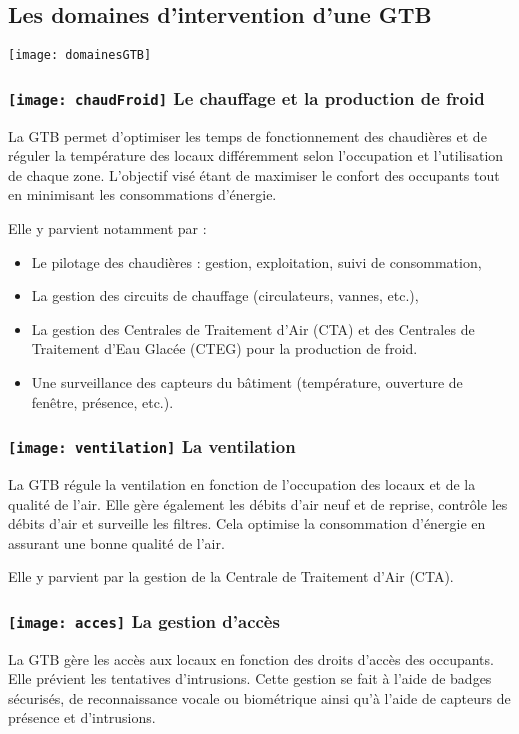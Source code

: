 \subsection{Les domaines d'intervention d'une GTB}
\begin{center}
	\texttt{[image: domainesGTB]}
\end{center}
\subsubsection{\texttt{[image: chaudFroid]} Le chauffage et la production de froid}
La GTB permet d'optimiser les temps de fonctionnement des chaudières et de réguler la température des locaux différemment selon l'occupation et l'utilisation de chaque zone. L'objectif visé étant de maximiser le confort des occupants tout en minimisant les consommations d'énergie.

Elle y parvient notamment par :
\begin{itemize}
	\item Le pilotage des chaudières : gestion, exploitation, suivi de consommation,
	\item La gestion des circuits de chauffage (circulateurs, vannes, etc.),
	\item La gestion des Centrales de Traitement d'Air (CTA) et des Centrales de Traitement d'Eau Glacée (CTEG) pour la production de froid.
	\item Une surveillance des capteurs du bâtiment (température, ouverture de fenêtre, présence, etc.).
\end{itemize}

\subsubsection{\texttt{[image: ventilation]} La ventilation}
La GTB régule la ventilation en fonction de l'occupation des locaux et de la qualité de l'air. Elle gère également les débits d'air neuf et de reprise, contrôle les débits d'air et surveille les filtres. Cela optimise la consommation d'énergie en assurant une bonne qualité de l'air.

Elle y parvient par la gestion de la Centrale de Traitement d'Air (CTA).

\subsubsection{\texttt{[image: acces]} La gestion d'accès}
La GTB gère les accès aux locaux en fonction des droits d'accès des occupants. Elle prévient les tentatives d'intrusions. Cette gestion se fait à l'aide de badges sécurisés, de reconnaissance vocale ou biométrique ainsi qu'à l'aide de capteurs de présence et d'intrusions.

